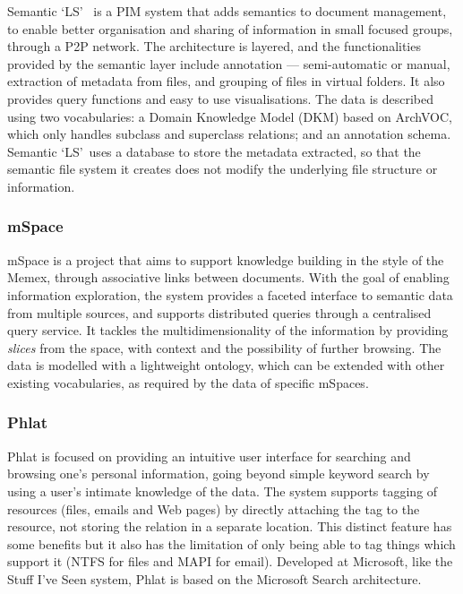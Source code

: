 Semantic \textquoteleft LS\textquoteright ~\cite{Krishnan2008} is a PIM system that adds semantics to document management, to enable better organisation and sharing of information in small focused groups, through a P2P network. The architecture is layered, and the functionalities provided by the semantic layer include annotation --- semi-automatic or manual, extraction of metadata from files, and grouping of files in virtual folders. It also provides query functions and easy to use visualisations. The data is described using two vocabularies: a Domain Knowledge Model (DKM) based on ArchVOC, which only handles subclass and superclass relations; and an annotation schema. Semantic \textquoteleft LS\textquoteright ~uses a database to store the metadata extracted, so that the semantic file system it creates does not modify the underlying file structure or information.

\subsubsection{mSpace}

mSpace \cite{Smith2005} is a project that aims to support knowledge building in the style of the Memex, through associative links between documents. With the goal of enabling information exploration, the system provides a faceted interface to semantic data from multiple sources, and supports distributed queries through a centralised query service. It tackles the multidimensionality of the information by providing \emph{slices} from the space, with context and the possibility of further browsing. The data is modelled with a lightweight ontology,  which can be extended with other existing vocabularies, as required by the data of specific mSpaces. 

\subsubsection{Phlat}

Phlat \cite{Cutrell2006} is focused on providing an intuitive user interface for searching and browsing one's personal information, going beyond simple keyword search by using a user's intimate knowledge of the data. The system supports tagging of resources (files, emails and Web pages) by directly attaching the tag to the resource, not storing the relation in a separate location. This distinct feature has some benefits but it also has the limitation of only being able to tag things which support it (NTFS for files and MAPI for email). Developed at Microsoft, like the Stuff I've Seen system, Phlat is based on the Microsoft Search architecture.

